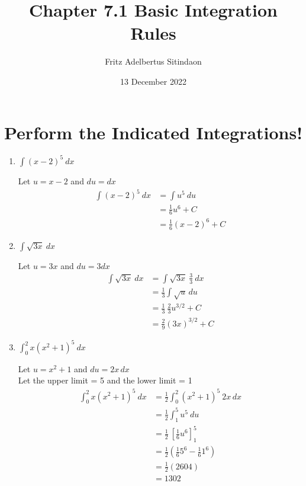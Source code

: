 \documentclass[12pt]{article}
\title{Chapter 7.1 Basic Integration Rules}
\author{Fritz Adelbertus Sitindaon}
\date{13 December 2022}
\begin{document}
\maketitle

\section{Perform the Indicated Integrations!}  
  
\begin{enumerate}
\item $\displaystyle\int(x-2)^5 \ dx $

Let $u = x-2$ and $du = dx$
\begin{equation*}
\begin{aligned}
\int(x-2)^5 \ dx &= \int u^5 \ du \\
&= \frac{1}{6}u^6 + C \\
&= \frac{1}{6}(x-2)^6 + C
\end{aligned}
\end{equation*}

\item $\displaystyle\int\sqrt{3x} \ dx $

Let $u = 3x$ and $du = 3dx$
\begin{equation*}
\begin{aligned}
\int \sqrt{3x} \ dx &= \int \sqrt{3x}\ \frac{3}{3} \ dx \\
&= \frac{1}{3} \int \sqrt{u} \, du \\
&= \frac{1}{3} \ \frac{2}{3} u^{3/2} + C \\
&= \frac{2}{9} (3x)^{3/2} + C
\end{aligned}
\end{equation*}
 
\item $\displaystyle\int_0^2x(x^2+1)^5 \ dx $

Let $u = x^2+1$ and $du = 2x\,dx$ \\
Let the upper limit = 5 and the lower limit = 1 
\begin{equation*}
\begin{aligned}
\int_0^2x(x^2+1)^5 \ dx  &= \frac{1}{2} \int_0^2(x^2+1)^5 \ 2x\,dx \\
&= \frac{1}{2} \int_1^5 u^5 \ du \\
&= \frac{1}{2} \ \left[\frac{1}{6} u^6\right]_1^5 \\
&= \frac{1}{2} \left(\frac{1}{6} 5^6 - \frac{1}{6} 1^6 \right) \\
&= \frac{1}{2} (2604) \\
&= 1302
\end{aligned}
\end{equation*}


\end{enumerate}
\end{document}
